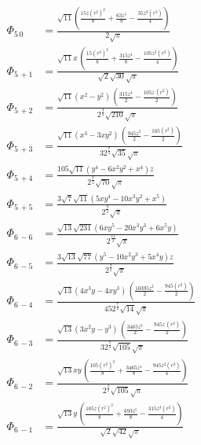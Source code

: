 \documentclass[10pt]{article}
\begin{document}
\begin{align*}
    \Phi_{5\, 0} &= \frac{\sqrt{11} \left( \frac{15 z {{\left( r^2\right) }^{2}}}{8}+\frac{63 {{z}^{5}}}{8}-\frac{35 {{z}^{3}} \left( r^2\right) }{4}\right) }{2 \sqrt{\ensuremath{\pi} }} \\
    \Phi_{5\, +1} &= \frac{\sqrt{11} x\, \left( \frac{15 {{\left( r^2\right) }^{2}}}{8}+\frac{315 {{z}^{4}}}{8}-\frac{105 {{z}^{2}} \left( r^2\right) }{4}\right) }{\sqrt{2} \sqrt{30} \sqrt{\ensuremath{\pi} }} \\
    \Phi_{5\, +2} &= \frac{\sqrt{11} \left( {{x}^{2}}-{{y}^{2}}\right) \, \left( \frac{315 {{z}^{3}}}{2}-\frac{105 z\, \left( r^2\right) }{2}\right) }{{{2}^{\frac{3}{2}}} \sqrt{210} \sqrt{\ensuremath{\pi} }} \\
    \Phi_{5\, +3} &= \frac{\sqrt{11} \left( {{x}^{3}}-3 x {{y}^{2}}\right) \, \left( \frac{945 {{z}^{2}}}{2}-\frac{105 \left( r^2\right) }{2}\right) }{3 {{2}^{\frac{7}{2}}} \sqrt{35} \sqrt{\ensuremath{\pi} }} \\
    \Phi_{5\, +4} &= \frac{105 \sqrt{11} \left( {{y}^{4}}-6 {{x}^{2}} {{y}^{2}}+{{x}^{4}}\right)  z}{{{2}^{\frac{7}{2}}} \sqrt{70} \sqrt{\ensuremath{\pi} }} \\
    \Phi_{5\, +5} &= \frac{3 \sqrt{7} \sqrt{11} \left( 5 x {{y}^{4}}-10 {{x}^{3}} {{y}^{2}}+{{x}^{5}}\right) }{{{2}^{\frac{9}{2}}} \sqrt{\ensuremath{\pi} }} \\
%
    \Phi_{6\, -6} &= \frac{\sqrt{13} \sqrt{231} \left( 6 x {{y}^{5}}-20 {{x}^{3}} {{y}^{3}}+6 {{x}^{5}} y\right) }{{{2}^{\frac{11}{2}}} \sqrt{\ensuremath{\pi} }} \\
    \Phi_{6\, -5} &= \frac{3 \sqrt{13} \sqrt{77} \left( {{y}^{5}}-10 {{x}^{2}} {{y}^{3}}+5 {{x}^{4}} y\right)  z}{{{2}^{\frac{9}{2}}} \sqrt{\ensuremath{\pi} }} \\
    \Phi_{6\, -4} &= \frac{\sqrt{13} \left( 4 {{x}^{3}} y-4 x {{y}^{3}}\right) \, \left( \frac{10395 {{z}^{2}}}{2}-\frac{945 \left( r^2\right) }{2}\right) }{45 {{2}^{\frac{7}{2}}} \sqrt{14} \sqrt{\ensuremath{\pi} }} \\
    \Phi_{6\, -3} &= \frac{\sqrt{13} \left( 3 {{x}^{2}} y-{{y}^{3}}\right) \, \left( \frac{3465 {{z}^{3}}}{2}-\frac{945 z\, \left( r^2\right) }{2}\right) }{3 {{2}^{\frac{7}{2}}} \sqrt{105} \sqrt{\ensuremath{\pi} }} \\
    \Phi_{6\, -2} &= \frac{\sqrt{13} x y\, \left( \frac{105 {{\left( r^2\right) }^{2}}}{8}+\frac{3465 {{z}^{4}}}{8}-\frac{945 {{z}^{2}} \left( r^2\right) }{4}\right) }{{{2}^{\frac{3}{2}}} \sqrt{105} \sqrt{\ensuremath{\pi} }} \\
    \Phi_{6\, -1} &= \frac{\sqrt{13} y\, \left( \frac{105 z {{\left( r^2\right) }^{2}}}{8}+\frac{693 {{z}^{5}}}{8}-\frac{315 {{z}^{3}} \left( r^2\right) }{4}\right) }{\sqrt{2} \sqrt{42} \sqrt{\ensuremath{\pi} }} \\

\end{align*}
\end{document}
